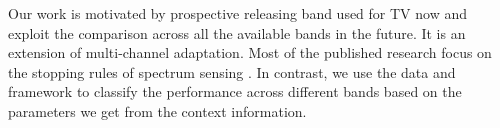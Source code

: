 Our work is motivated by prospective releasing band used for TV now and exploit the comparison across all the available bands in the future. 
It is an extension of multi-channel adaptation. 
Most of the published research focus on the stopping rules of spectrum sensing \cite{sabharwal2007opportunistic, OAR}. In contrast, we use the data and framework to classify the performance across different bands based on the parameters we get from the context information.

